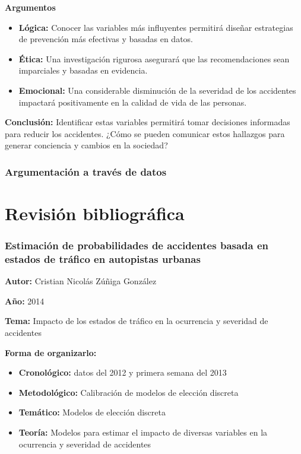 \documentclass{book}
\begin{document}
\textbf{Argumentos}
\begin{itemize}
    \item \textbf{Lógica:} Conocer las variables más influyentes permitirá diseñar estrategias de prevención más efectivas y basadas en datos.
    \item \textbf{Ética:} Una investigación rigurosa asegurará que las recomendaciones sean imparciales y basadas en evidencia.
    \item \textbf{Emocional:} Una considerable disminución de la severidad de los accidentes impactará positivamente en la calidad de vida de las personas.
\end{itemize}

\textbf{Conclusión:} Identificar estas variables permitirá tomar decisiones informadas para reducir los accidentes. ¿Cómo se pueden comunicar estos hallazgos para generar conciencia y cambios en la sociedad?

\subsubsection{Argumentación a través de datos}

\section{Revisión bibliográfica}

\subsubsection{Estimación de probabilidades de accidentes basada en estados de tráfico en autopistas urbanas}
\textbf{Autor:} Cristian Nicolás Zúñiga González

\textbf{Año:} 2014

\textbf{Tema:} Impacto de los estados de tráfico en la ocurrencia y severidad de accidentes

\textbf{Forma de organizarlo:}

\begin{itemize}
\setlength{\itemindent}{0.5in}
    \item \textbf{Cronológico:} datos del 2012 y primera semana del 2013
    \item \textbf{Metodológico:} Calibración de modelos de elección discreta
    \item \textbf{Temático:} Modelos de elección discreta
    \item \textbf{Teoría:} Modelos para estimar el impacto de diversas variables en la ocurrencia y severidad de accidentes
\end{itemize}
\end{document}
